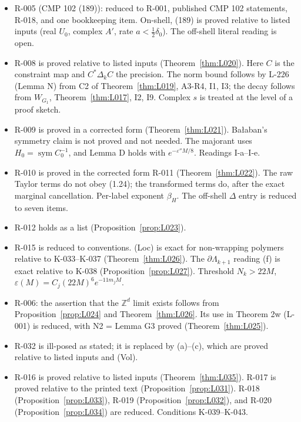 \begin{itemize}
\begin{itemize}
\begin{remark}
In CMP 96 (2.126)--(2.127) one step of the proof is false for $L\ge10$: a factor $L$ is lost. The statement of Lemma 2.4 stands with the corrected constant.
\end{remark}
\item R-005 (CMP 102 (189)): reduced to R-001, published CMP 102 statements, R-018, and one bookkeeping item. On-shell, (189) is proved relative to listed inputs (real $U_0$, complex $A'$, rate $a<\frac12\delta_0$). The off-shell literal reading is open.
\item R-008 is proved relative to listed inputs (Theorem~\ref{thm:L020}). Here $C$ is the constraint map and $C^*\Delta_kC$ the precision. The norm bound follows by L-226 (Lemma N) from C2 of Theorem~\ref{thm:L019}, A3-R4, I1, I3; the decay follows from $W_{G_1}$, Theorem~\ref{thm:L017}, I2, I9. Complex $s$ is treated at the level of a proof sketch.
\item R-009 is proved in a corrected form (Theorem~\ref{thm:L021}). Ba{\l}aban's symmetry claim is not proved and not needed. The majorant uses $H_0=\operatorname{sym}C_0^{-1}$, and Lemma D holds with $e^{-\varepsilon''M/8}$. Readings I-a--I-e.
\item R-010 is proved in the corrected form R-011 (Theorem~\ref{thm:L022}). The raw Taylor terms do not obey (1.24); the transformed terms do, after the exact marginal cancellation. Per-label exponent $\beta_H$. The off-shell $\Delta$ entry is reduced to seven items.
\item R-012 holds as a list (Proposition~\ref{prop:L023}).
\item R-015 is reduced to conventions. (Loc) is exact for non-wrapping polymers relative to K-033--K-037 (Theorem~\ref{thm:L026}). The $\partial\Lambda_{k+1}$ reading (f) is exact relative to K-038 (Proposition~\ref{prop:L027}). Threshold $N_k>22M$, $\varepsilon(M)=C_j(22M)^6e^{-11m_jM}$.
\item R-006: the assertion that the $\mathbb Z^d$ limit exists follows from Proposition~\ref{prop:L024} and Theorem~\ref{thm:L026}. Its use in Theorem 2w (L-001) is reduced, with N2 = Lemma G3 proved (Theorem~\ref{thm:L025}).
\item R-032 is ill-posed as stated; it is replaced by (a)--(c), which are proved relative to listed inputs and (Vol).
\item R-016 is proved relative to listed inputs (Theorem~\ref{thm:L035}). R-017 is proved relative to the printed text (Proposition~\ref{prop:L031}). R-018 (Proposition~\ref{prop:L033}), R-019 (Proposition~\ref{prop:L032}), and R-020 (Proposition~\ref{prop:L034}) are reduced. Conditions K-039--K-043.

\end{itemize}
\end{itemize}
